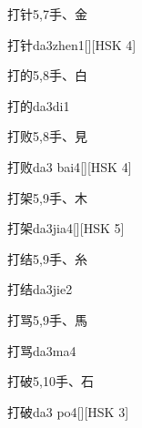 \begin{entry}{打针}{5,7}{⼿、⾦}
  \begin{phonetics}{打针}{da3zhen1}[][HSK 4]
  \end{phonetics}
\end{entry}

\begin{entry}{打的}{5,8}{⼿、⽩}
  \begin{phonetics}{打的}{da3di1}
  \end{phonetics}
\end{entry}

\begin{entry}{打败}{5,8}{⼿、⾒}
  \begin{phonetics}{打败}{da3 bai4}[][HSK 4]
  \end{phonetics}
\end{entry}

\begin{entry}{打架}{5,9}{⼿、⽊}
  \begin{phonetics}{打架}{da3jia4}[][HSK 5]
  \end{phonetics}
\end{entry}

\begin{entry}{打结}{5,9}{⼿、⽷}
  \begin{phonetics}{打结}{da3jie2}
  \end{phonetics}
\end{entry}

\begin{entry}{打骂}{5,9}{⼿、⾺}
  \begin{phonetics}{打骂}{da3ma4}
  \end{phonetics}
\end{entry}

\begin{entry}{打破}{5,10}{⼿、⽯}
  \begin{phonetics}{打破}{da3 po4}[][HSK 3]
  \end{phonetics}
\end{entry}

